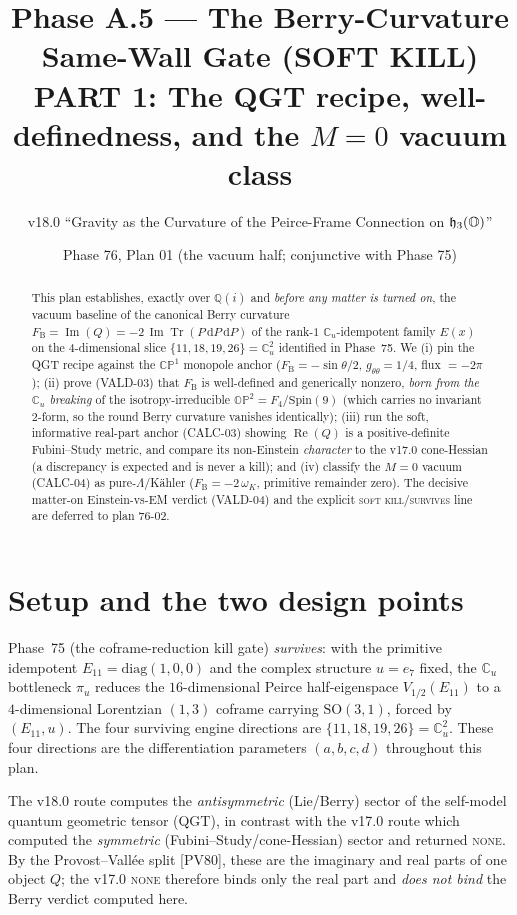 \documentclass[11pt]{article}
\title{Phase A.5 --- The Berry-Curvature Same-Wall Gate (SOFT KILL)\\
\large PART 1: The QGT recipe, well-definedness, and the $M=0$ vacuum class}
\author{v18.0 ``Gravity as the Curvature of the Peirce-Frame Connection on $\mathfrak{h}_3(\mathbb{O})$''}
\date{Phase 76, Plan 01 (the vacuum half; conjunctive with Phase 75)}
\newcommand{\Tr}{\operatorname{Tr}}
\renewcommand{\Re}{\operatorname{Re}}
\renewcommand{\Im}{\operatorname{Im}}
\newcommand{\dd}{\mathrm{d}}
\newcommand{\Cu}{\mathbb{C}_u}
\newcommand{\OP}{\mathbb{OP}^2}
\newcommand{\Spin}{\mathrm{Spin}}
\newcommand{\SO}{\mathrm{SO}}
\newcommand{\FB}{F_{\mathrm{B}}}
\theoremstyle{plain}
\theoremstyle{definition}
\begin{document}
\maketitle

\begin{abstract}
This plan establishes, exactly over $\mathbb{Q}(i)$ and \emph{before any matter is
turned on}, the vacuum baseline of the canonical Berry curvature
$\FB = \Im(Q) = -2\,\Im\Tr(P\,\dd P\,\dd P)$ of the rank-$1$ $\Cu$-idempotent family
$E(x)$ on the $4$-dimensional slice $\{11,18,19,26\}=\Cu^2$ identified in Phase~75.
We (i) pin the QGT recipe against the $\mathbb{CP}^1$ monopole anchor
($\FB=-\sin\theta/2$, $g_{\theta\theta}=1/4$, flux $=-2\pi$); (ii) prove (VALD-03)
that $\FB$ is well-defined and generically nonzero, \emph{born from the $\Cu$
breaking} of the isotropy-irreducible $\OP=F_4/\Spin(9)$ (which carries no invariant
$2$-form, so the round Berry curvature vanishes identically); (iii) run the soft,
informative real-part anchor (CALC-03) showing $\Re(Q)$ is a positive-definite
Fubini--Study metric, and compare its non-Einstein \emph{character} to the v17.0
cone-Hessian (a discrepancy is expected and is never a kill); and (iv) classify the
$M=0$ vacuum (CALC-04) as pure-$\Lambda$/K\"ahler ($\FB=-2\,\omega_K$, primitive
remainder zero). The decisive matter-on Einstein-vs-EM verdict (VALD-04) and the
explicit \textsc{soft kill}/\textsc{survives} line are deferred to plan 76-02.
\end{abstract}

\section{Setup and the two design points}
\label{sec:setup}

Phase~75 (the coframe-reduction kill gate) \emph{survives}: with the primitive
idempotent $E_{11}=\mathrm{diag}(1,0,0)$ and the complex structure $u=e_7$ fixed, the
$\Cu$ bottleneck $\pi_u$ reduces the $16$-dimensional Peirce half-eigenspace
$V_{1/2}(E_{11})$ to a $4$-dimensional Lorentzian $(1,3)$ coframe carrying
$\SO(3,1)$, forced by $(E_{11},u)$. The four surviving engine directions are
$\{11,18,19,26\}=\Cu^2$. These four directions are the differentiation parameters
$(a,b,c,d)$ throughout this plan.

The v18.0 route computes the \emph{antisymmetric} (Lie/Berry) sector of the
self-model quantum geometric tensor (QGT), in contrast with the v17.0 route which
computed the \emph{symmetric} (Fubini--Study/cone-Hessian) sector and returned
\textsc{none}. By the Provost--Vall\'ee split [PV80], these are the imaginary and
real parts of one object $Q$; the v17.0 \textsc{none} therefore binds only the real
part and \emph{does not bind} the Berry verdict computed here.
\end{document}
